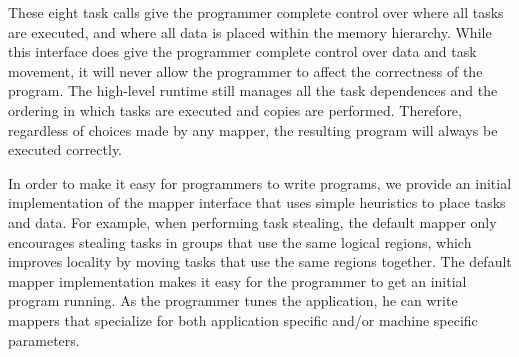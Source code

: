 




These eight task calls give the programmer complete control over where all tasks are executed, and
where all data is placed within the memory hierarchy.  While this interface does give the programmer
complete control over data and task movement, it will never allow the programmer to affect the
correctness of the program.  The high-level runtime still manages all the task dependences and the
ordering in which tasks are executed and copies are performed.  Therefore, regardless of choices
made by any mapper, the resulting program will always be executed correctly.

In order to make it easy for programmers to write programs, we provide an initial implementation 
of the mapper interface that uses simple heuristics to place tasks and data.  For example, when
performing task stealing, the default mapper only encourages stealing tasks in groups that use
the same logical regions, which improves locality by moving tasks that use the same regions
together.  The default mapper implementation makes it easy for the programmer to get an 
initial program running.  As the programmer tunes the application, he can write mappers that
specialize for both application specific and/or machine specific parameters.

